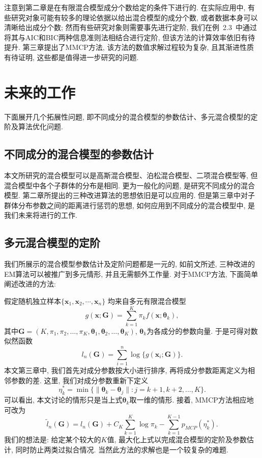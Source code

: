 \documentclass[a4paper,12pt,openany,oneside,utf-8]{ctexbook}
\begin{document}
注意到第二章是在有限混合模型成分个数给定的条件下进行的. 在实际应用中, 有些研究对象可能有较多的理论依据以给出混合模型的成分个数, 或者数据本身可以清晰给出成分个数; 然而有些研究对象则需要事先进行定阶, 我们在例~2.3~中通过将其与AIC和BIC两种信息准则法相结合进行定阶, 但该方法的计算效率依旧有待提升. 第三章提出了MMCP方法, 该方法的数值求解过程较为复杂, 且其渐进性质有待证明, 这些都是值得进一步研究的问题.

\section{未来的工作}
下面展开几个拓展性问题, 即不同成分的混合模型的参数估计、多元混合模型的定阶及算法优化问题.

\subsection{不同成分的混合模型的参数估计}
本文所研究的混合模型可以是高斯混合模型、泊松混合模型、二项混合模型等, 但混合模型中各个子群体的分布是相同. 更为一般化的问题, 是研究不同成分的混合模型. 第二章所提出的三种改进算法的思想依旧是可以应用的. 但是第三章中对子群体分布参数之间的距离进行惩罚的思想, 如何应用到不同成分的混合模型中, 是我们未来将进行的工作.

\subsection{多元混合模型的定阶}
我们所展示的混合模型参数估计及定阶问题都是一元的, 如前文所述, 三种改进的EM算法可以被推广到多元情形, 并且无需额外工作量. 对于MMCP方法, 下面简单阐述改进的方法:

假定随机独立样本$\{\bm{x}_1, \bm{x}_2, \cdots, \bm{x}_n\}$ 均来自多元有限混合模型
\begin{equation*}
  g(\bm{x}; \bm{G})=\sum_{k=1}^{K}\pi_{k}f(\bm{x}; \bm{\theta}_{k}),
\end{equation*}
其中$\bm{G} = (K, \pi_1, \pi_2, \ldots, \pi_K, \bm{\theta}_1, \bm{\theta}_2, \ldots, \bm{\theta}_K)$, $\bm{\theta}_k$为各成分的参数向量. 于是可得对数似然函数
\begin{equation*}
  l_{n}(\bm{G})=\sum_{i=1}^{n}\log\{g(\bm{x}_i; \bm{G})\}.%
\end{equation*}
本文第三章中, 我们首先对成分参数按大小进行排序, 再将成分参数距离定义为相邻参数的差. 这里, 我们对成分参数重新下定义
\begin{equation*}
  \eta_{k}^{\ast}=\min\{\|\bm{\theta}_{k}-\bm{\theta}_{j}\|: j=k+1, k+2, ..., K\}.
\end{equation*}
可以看出, 本文讨论的情形只是当上式$\bm{\theta}_{k}$取一维的情形. 接着, MMCP方法相应地可改为
\begin{equation*}
  \tilde{l}_{n}(\bm{G})=l_{n}(\bm{G}) + C_{K}\sum_{k=1}^{K}\log\pi_{k} - \sum_{k=1}^{K-1}p_{MCP}(\eta_{k}^{\ast}).
\end{equation*}
我们的想法是: 给定某个较大的$K$值, 最大化上式以完成混合模型的定阶及参数估计, 同时防止两类过拟合情况. 当然此方法的求解也是一个较复杂的难题.
\end{document}
